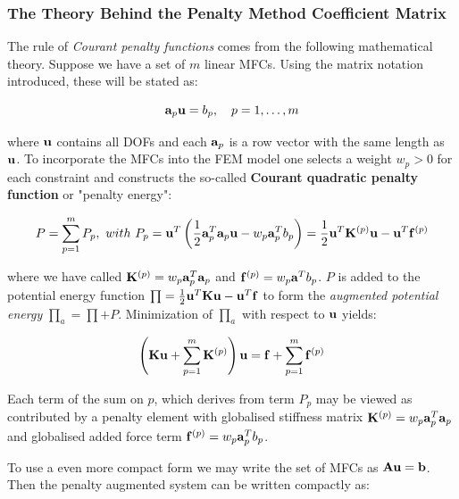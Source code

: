 \subsubsection{The Theory Behind the Penalty Method Coefficient Matrix}

The rule of \textit{Courant penalty functions} comes from the following
mathematical theory. Suppose we have a set of $ m $ linear MFCs. Using
the matrix notation introduced, these will be stated as:

\begin{equation}
    \mathbf{a}_p \mathbf{u} = b_p, \quad p = 1, \dots, m
\end{equation}

where $ \mathbf{u} $ contains all DOFs and each $ \mathbf{a}_p $ is a row vector
with the same length as $ \mathbf{u} $. To incorporate the MFCs into the FEM
model one selects a weight $ w_p > 0 $ for each constraint and constructs the
so-called \textbf{Courant quadratic penalty function} or "penalty energy":

\begin{equation}
    P = \sum_{p=1}^m P_p,\ with\ 
    P_p = \m{u}^T \left(
        \frac{1}{2} \m{a}_p^T \m{a}_p \m{u}
        - w_p \m{a}_p^T b_p
        \right)
        = \frac{1}{2} \m{u}^T \m{K}^{(p)} \m{u}
        - \m{u}^T \m{f}^{(p)}
\end{equation}

where we have called $ \mathbf{K}^{(p)} = w_p \mathbf{a}_p^T \mathbf{a}_p $
and $ \mathbf{f}^{(p)} = w_p \mathbf{a}^T b_p $. $ P $ is added to the potential
energy function
$ \prod = \frac{1}{2} \mathbf{u}^T \mathbf{K} \mathbf{u} - \mathbf{u}^T \mathbf{f} $
to form the \textit{augmented potential energy} $ \prod_a = \prod + P $.
Minimization of $ \prod_a $ with respect to $ \mathbf{u} $ yields:

\begin{equation}\label{nb-ch3-mfc-augmented-potential-energy}
    \left( \mathbf{K} \mathbf{u} + \sum_{p=1}^m \mathbf{K}^{(p)} \right) \mathbf{u}
    = \mathbf{f} + \sum_{p=1}^m \mathbf{f}^{(p)}
\end{equation}

Each term of the sum on $ p $, which derives from term $ P_p $ may be viewed as
contributed by a penalty element with globalised stiffness matrix
$ \mathbf{K}^{(p)} = w_p \mathbf{a}_p^T \mathbf{a}_p $ and globalised added
force term $ \mathbf{f}^{(p)} = w_p \mathbf{a}_p^T b_p $.

To use a even more compact form we may write the set of MFCs as
$ \mathbf{A} \mathbf{u} = \mathbf{b} $. Then the penalty augmented system can
be written compactly as:

